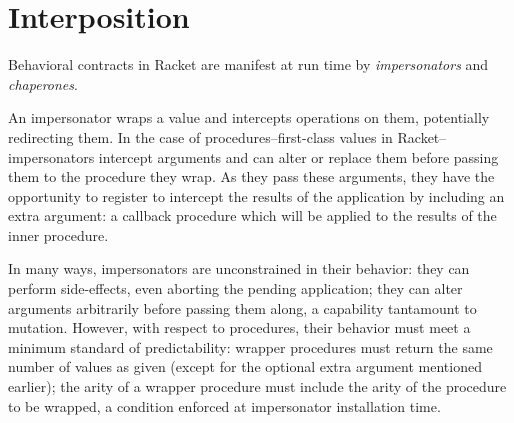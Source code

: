 \documentclass{sigplanconf}
\begin{document}


\section{Interposition}

Behavioral contracts in Racket are manifest at run time by \emph{impersonators} and \emph{chaperones}.

An impersonator wraps a value and intercepts operations on them, potentially redirecting them.
In the case of procedures--first-class values in Racket--impersonators intercept arguments and can alter or replace them before passing them to the procedure they wrap.
As they pass these arguments, they have the opportunity to register to intercept the results of the application by including an extra argument: a callback procedure which will be applied to the results of the inner procedure.

In many ways, impersonators are unconstrained in their behavior: they can perform side-effects, even aborting the pending application; they can alter arguments arbitrarily before passing them along, a capability tantamount to mutation.
However, with respect to procedures, their behavior must meet a minimum standard of predictability: wrapper procedures must return the same number of values as given (except for the optional extra argument mentioned earlier); the arity of a wrapper procedure must include the arity of the procedure to be wrapped, a condition enforced at impersonator installation time.
\end{document}
